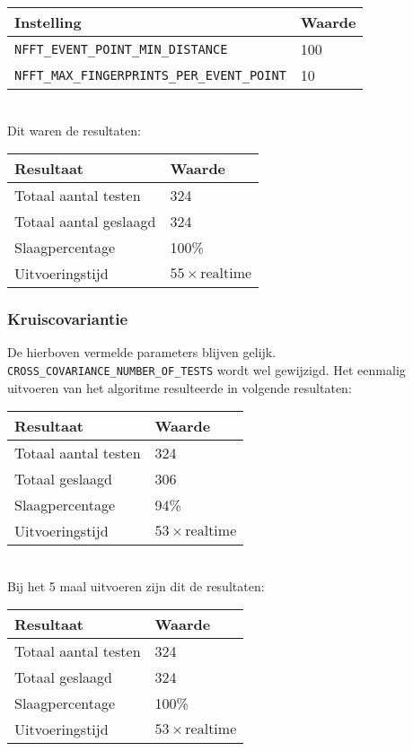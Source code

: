 \begin{tabular}{ l  l}
	\hline
	\textbf{Instelling} & \textbf{Waarde} \\
	\hline
	\texttt{NFFT\_EVENT\_POINT\_MIN\_DISTANCE} & 100 \\
	\texttt{NFFT\_MAX\_FINGERPRINTS\_PER\_EVENT\_POINT} & 10 
\end{tabular}\\

Dit waren de resultaten:

\begin{tabular}{ l  l}
	\hline
	\textbf{Resultaat} & \textbf{Waarde} \\
	\hline
	Totaal aantal testen & 324 \\
	Totaal aantal geslaagd & 324 \\
	Slaagpercentage & 100\% \\
	Uitvoeringstijd & $55 \times \textrm{realtime}$
\end{tabular}

\subsubsection{Kruiscovariantie}

De hierboven vermelde parameters blijven gelijk. \texttt{CROSS\_COVARIANCE\_NUMBER\_OF\_TESTS} wordt wel gewijzigd. Het eenmalig uitvoeren van het algoritme resulteerde in volgende resultaten:

\begin{tabular}{ l  l}
	\hline
	\textbf{Resultaat} & \textbf{Waarde} \\
	\hline
	Totaal aantal testen & 324 \\
	Totaal geslaagd & 306 \\
	Slaagpercentage & 94\% \\
	Uitvoeringstijd & $53 \times \textrm{realtime}$ \\
\end{tabular}\\

Bij het 5 maal uitvoeren zijn dit de resultaten:

\begin{tabular}{ l  l}
	\hline
	\textbf{Resultaat} & \textbf{Waarde} \\
	\hline
	Totaal aantal testen & 324 \\
	Totaal geslaagd & 324 \\
	Slaagpercentage & 100\% \\
	Uitvoeringstijd & $53 \times \textrm{realtime}$ \\
\end{tabular}\\

